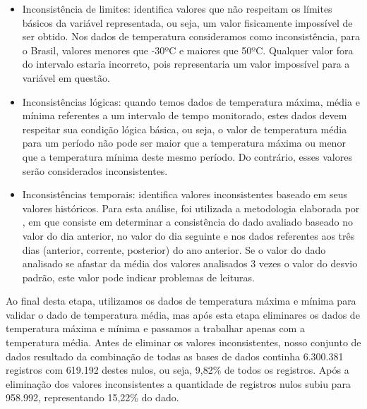 \begin{itemize}
	\item Inconsistência de limites: identifica valores que não respeitam os límites básicos da variável representada, ou seja, um valor fisicamente impossível de ser obtido. Nos dados de temperatura consideramos como inconsistência, para o Brasil, valores menores que -30ºC e maiores que 50ºC. Qualquer valor fora do intervalo estaria incorreto, pois representaria um valor impossível para a variável em questão.
	\item Inconsistências lógicas: quando temos dados de temperatura máxima, média e mínima referentes a um intervalo de tempo monitorado, estes dados devem respeitar sua condição lógica básica, ou seja, o valor de temperatura média para um período não pode ser maior que a temperatura máxima ou menor que a temperatura mínima deste mesmo período. Do contrário, esses valores serão considerados inconsistentes.     
	\item Inconsistências temporais: identifica valores inconsistentes baseado em seus valores históricos. Para esta análise, foi utilizada a metodologia elaborada por \cite{mateo2008design}, em que consiste em determinar a consistência do dado avaliado baseado no valor do dia anterior, no valor do dia  seguinte e nos dados referentes aos três dias (anterior, corrente, posterior) do ano anterior. Se o valor do dado analisado se afastar da média dos valores analisados 3 vezes o valor do desvio padrão, este valor pode indicar problemas de leituras.  
\end{itemize}

Ao final desta etapa, utilizamos os dados de temperatura máxima e mínima para validar o dado de temperatura média, mas após esta etapa eliminares os dados de temperatura máxima e mínima e passamos a trabalhar apenas com a temperatura média. Antes de eliminar os valores inconsistentes, nosso conjunto de dados resultado da combinação de todas as bases de dados continha 6.300.381 registros com 619.192 destes nulos, ou seja, 9,82\% de todos os registros. Após a eliminação dos valores inconsistentes a quantidade de registros nulos subiu para 958.992, representando 15,22\% do dado. 

